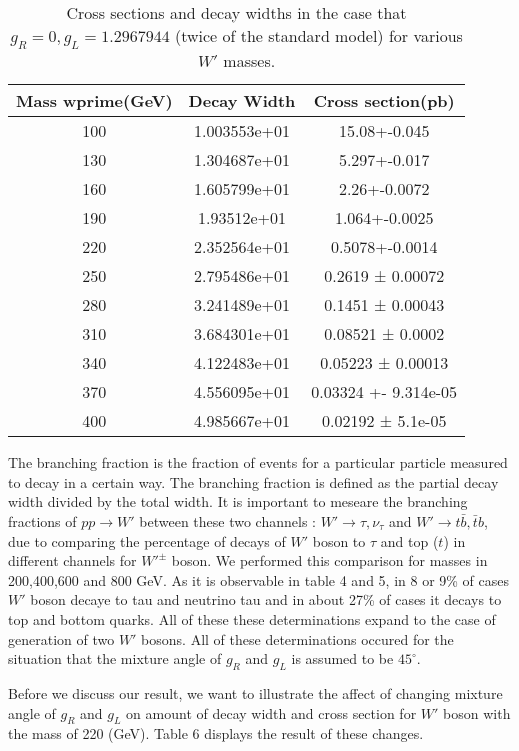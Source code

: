 \begin{table}[htb]
	\centering
\begin{tabular}{|ccc|}
\hline 
Mass wprime(GeV)  &  Decay Width  &  Cross section(pb)\\
\hline 
100& 1.003553e+01& 15.08+-0.045\\
130 &1.304687e+01& 5.297+-0.017\\
160& 1.605799e+01& 2.26+-0.0072 \\
190&1.93512e+01& 1.064+-0.0025\\
220& 2.352564e+01& 0.5078+-0.0014\\
250& 2.795486e+01& 0.2619 ± 0.00072\\
280& 3.241489e+01& 0.1451 ± 0.00043\\
310& 3.684301e+01& 0.08521 ± 0.0002\\
340& 4.122483e+01& 0.05223 ± 0.00013\\
370& 4.556095e+01&0.03324 +- 9.314e-05\\
400& 4.985667e+01& 0.02192 ± 5.1e-05\\ 

\hline
\end{tabular}
\caption{Cross sections and decay widths in the case that $ g_R=0 , g_L=1.2967944  $ (twice of the standard model) for various $W'$ masses. \label{tab1} }
\end{table}
 The branching fraction is the fraction of events for a particular particle measured to decay in a certain way. The branching fraction is defined as the partial decay width divided by the total width. It is important to meseare the branching fractions of $ pp\rightarrow W'$ between these two channels : $ W'\rightarrow \tau,\nu_\tau $ and $ W'\rightarrow  t \bar{b},\bar{t}b $, due to comparing the percentage of decays of $ W' $ boson to $ \tau $ and top ($t$) in different channels for $ W'^\pm $ boson. We performed this comparison for masses in 200,400,600 and 800 GeV. As it is observable in table 4 and 5, in 8 or 9\% of cases $W'$ boson decaye to tau and neutrino tau and in about 27\% of cases it decays to top and bottom quarks. All of these these determinations expand to the case of generation of two $ W' $ bosons. All of these determinations occured for  the situation that the mixture angle of $ g_R$ and  $g_L$ is assumed to be $45^\circ $. 
 
Before we discuss our result, we want to illustrate the affect of changing mixture angle of $ g_R$ and  $g_L$ on amount of decay width and cross section for $ W' $ boson with the mass of 220 (GeV). Table 6 displays the result of these changes.


